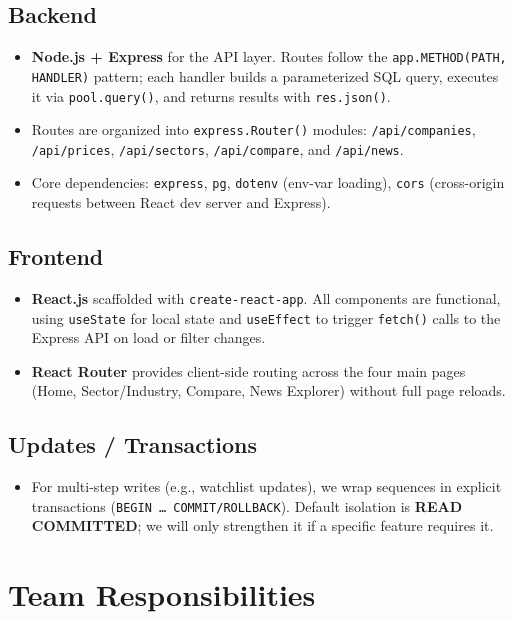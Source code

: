 \documentclass[11pt]{article}
\begin{document}
\subsection{Backend}
\begin{itemize}
    \item \textbf{Node.js + Express} for the API layer. Routes follow the \texttt{app.METHOD(PATH, HANDLER)} pattern; each handler builds a parameterized SQL query, executes it via \texttt{pool.query()}, and returns results with \texttt{res.json()}.
    \item Routes are organized into \texttt{express.Router()} modules: \texttt{/api/companies}, \texttt{/api/prices}, \texttt{/api/sectors}, \texttt{/api/compare}, and \texttt{/api/news}.
    \item Core dependencies: \texttt{express}, \texttt{pg}, \texttt{dotenv} (env-var loading), \texttt{cors} (cross-origin requests between React dev server and Express).
\end{itemize}

\subsection{Frontend}
\begin{itemize}
    \item \textbf{React.js} scaffolded with \texttt{create-react-app}. All components are functional, using \texttt{useState} for local state and \texttt{useEffect} to trigger \texttt{fetch()} calls to the Express API on load or filter changes.
    \item \textbf{React Router} provides client-side routing across the four main pages (Home, Sector/Industry, Compare, News Explorer) without full page reloads.
\end{itemize}

\subsection{Updates / Transactions}
\begin{itemize}
    \item For multi-step writes (e.g., watchlist updates), we wrap sequences in explicit transactions (\texttt{BEGIN \ldots{} COMMIT/ROLLBACK}). Default isolation is \textbf{READ COMMITTED}; we will only strengthen it if a specific feature requires it.
\end{itemize}

\newpage
\section{Team Responsibilities}
\end{document}
